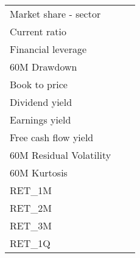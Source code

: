 \begin{tabular}{lll}
 Market share - sector               &               &          \\
 Current ratio                       &               &          \\
 Financial leverage                  &               &          \\
 60M Drawdown                        &               &          \\
 Book to price                       &               &          \\
 Dividend yield                      &               &          \\
 Earnings yield                      &               &          \\
 Free cash flow yield                &               &          \\
 60M Residual Volatility             &               &          \\
 60M Kurtosis                        &               &          \\
 RET\_1M                              &               &          \\
 RET\_2M                              &               &          \\
 RET\_3M                              &               &          \\
 RET\_1Q                              &               &          \\
\hline
\end{tabular}